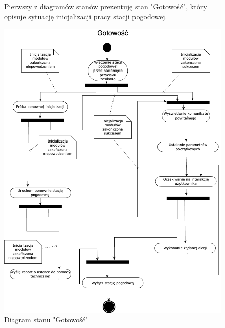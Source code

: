 \documentclass{article}
\begin{document}
\begin{figure}
    \centering
    \begin{minipage}{0.6\textwidth}
        \centering
        \large Pierwszy z diagramów stanów prezentuję stan "Gotowość", który opisuje sytuację inicjalizacji pracy stacji pogodowej.
    \end{minipage}
    \includegraphics[scale=0.5]{gotowosc.png}
    \caption{Diagram stanu "Gotowość"}
    \label{etykieta1}
\end{figure}
\end{document}
